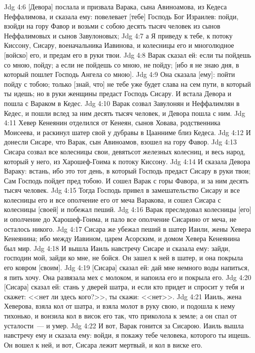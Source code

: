 \vs Jdg 4:6 [Девора] послала и призвала Варака, сына Авиноамова, из Кедеса Неффалимова, и сказала ему: повелевает [тебе] Господь Бог Израилев: пойди, взойди на гору Фавор и возьми с собою десять тысяч человек из сынов Неффалимовых и сынов Завулоновых;
\vs Jdg 4:7 а Я приведу к тебе, к потоку Киссону, Сисару, военачальника Иавинова, и колесницы его и многолюдное [войско] его, и предам его в руки твои.
\vs Jdg 4:8 Варак сказал ей: если ты пойдешь со мною, пойду; а если не пойдешь со мною, не пойду; [ибо я не знаю дня, в который пошлет Господь Ангела со мною].
\vs Jdg 4:9 Она сказала [ему]: пойти пойду с тобою; только [знай, что] не тебе уже будет слава на сем пути, в который ты идешь; но в руки женщины предаст Господь Сисару. И встала Девора и пошла с Вараком в Кедес.
\vs Jdg 4:10 Варак созвал Завулонян и Неффалимлян в Кедес, и пошли вслед за ним десять тысяч человек, и Девора пошла с ним.
\vs Jdg 4:11 Хевер Кенеянин отделился  от Кенеян, сынов Ховава, родственника Моисеева, и раскинул шатер свой у дубравы в Цаанниме близ Кедеса.
\rsbpar\vs Jdg 4:12 И донесли Сисаре, что Варак, сын Авиноамов, взошел на гору Фавор.
\vs Jdg 4:13 Сисара созвал все колесницы свои, девятьсот железных колесниц, и весь народ, который у него, из Харошеф-Гоима к потоку Киссону.
\vs Jdg 4:14 И сказала Девора Вараку: встань, ибо это тот день, в который Господь предаст Сисару в руки твои; Сам Господь пойдет пред тобою. И сошел Варак с горы Фавора, и за ним десять тысяч человек.
\vs Jdg 4:15 Тогда Господь привел в замешательство Сисару и все колесницы его и все ополчение его от меча Варакова, и сошел Сисара с колесницы [своей] и побежал пеший.
\vs Jdg 4:16 Варак преследовал колесницы [его] и ополчение до Харошеф-Гоима, и пало все ополчение Сисарино от меча, не осталось никого.
\vs Jdg 4:17 Сисара же убежал пеший в шатер Иаили, жены Хевера Кенеянина; ибо между Иавином, царем Асорским, и домом Хевера Кенеянина был мир.
\vs Jdg 4:18 И вышла Иаиль навстречу Сисаре и сказала ему: зайди, господин мой, зайди ко мне, не бойся. Он зашел к ней в шатер, и она покрыла его ковром [своим].
\vs Jdg 4:19 [Сисара] сказал ей: дай мне немного воды напиться, я пить хочу. Она развязала мех с молоком, и напоила его и  покрыла его.
\vs Jdg 4:20 [Сисара] сказал ей: стань у дверей шатра, и если кто придет и спросит у тебя и скажет: <<нет ли здесь кого?>>, ты скажи: <<нет>>.
\vs Jdg 4:21 Иаиль, жена Хеверова, взяла кол от шатра, и взяла молот в руку свою, и подошла к нему тихонько, и вонзила кол в висок его так, что приколола к земле; а он спал от усталости~--- и умер.
\vs Jdg 4:22 И вот, Варак гонится за Сисарою. Иаиль вышла навстречу ему и сказала ему: войди, я покажу тебе человека, которого ты ищешь. Он вошел к ней, и вот, Сисара лежит мертвый, и кол в виске его.
